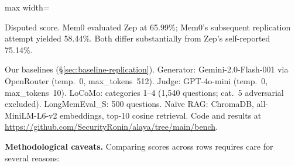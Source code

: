 \begin{table}[!t]
\begin{adjustbox}{max width=\textwidth}
\begin{threeparttable}
\begin{tablenotes}[flushleft]
\item[g] Disputed score.  Mem0 evaluated Zep at 65.99\%; Mem0's subsequent replication attempt yielded 58.44\%.  Both differ substantially from Zep's self-reported 75.14\%.
\item[h] Our baselines (\S\ref{sec:baseline-replication}).  Generator: Gemini-2.0-Flash-001 via OpenRouter (temp.~0, max\_tokens~512).  Judge: GPT-4o-mini (temp.~0, max\_tokens~10).  LoCoMo: categories 1--4 (1{,}540 questions; cat.~5 adversarial excluded).  LongMemEval\_S: 500 questions.  Na\"ive RAG: ChromaDB, all-MiniLM-L6-v2 embeddings, top-10 cosine retrieval.  Code and results at \url{https://github.com/SecurityRonin/alaya/tree/main/bench}.
\end{tablenotes}
\end{threeparttable}
\end{adjustbox}
\end{table}


\smallskip
\noindent\textbf{Methodological caveats.}\enspace
Comparing scores across rows requires care for several reasons:

